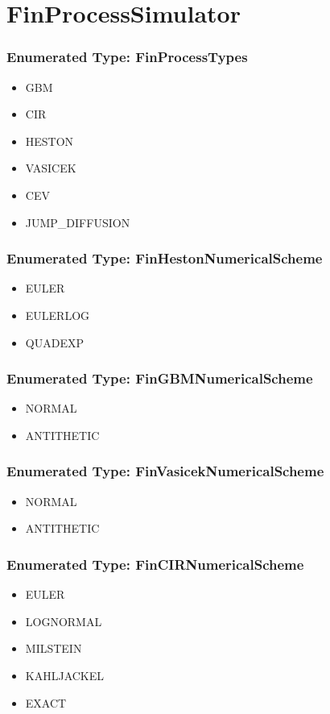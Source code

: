\documentclass[twoside,11pt]{book}
\begin{document}
\newpage
\section{FinProcessSimulator}

\subsubsection{Enumerated Type: FinProcessTypes}
\begin{itemize}
\item{GBM}
\item{CIR}
\item{HESTON}
\item{VASICEK}
\item{CEV}
\item{JUMP\_DIFFUSION}
\end{itemize}

\subsubsection{Enumerated Type: FinHestonNumericalScheme}
\begin{itemize}
\item{EULER}
\item{EULERLOG}
\item{QUADEXP}
\end{itemize}

\subsubsection{Enumerated Type: FinGBMNumericalScheme}
\begin{itemize}
\item{NORMAL}
\item{ANTITHETIC}
\end{itemize}

\subsubsection{Enumerated Type: FinVasicekNumericalScheme}
\begin{itemize}
\item{NORMAL}
\item{ANTITHETIC}
\end{itemize}

\subsubsection{Enumerated Type: FinCIRNumericalScheme}
\begin{itemize}
\item{EULER}
\item{LOGNORMAL}
\item{MILSTEIN}
\item{KAHLJACKEL}
\item{EXACT}
\end{itemize}
\end{document}
